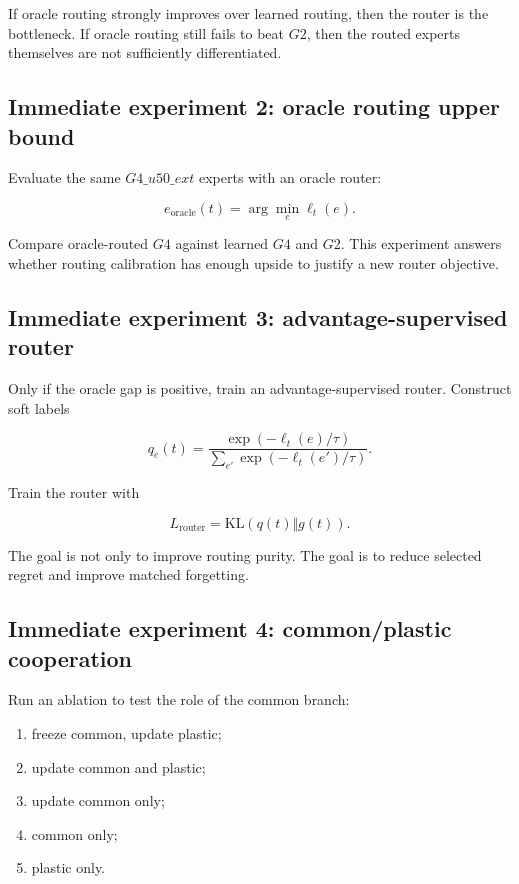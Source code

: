 \documentclass[11pt]{article}
\begin{document}
If oracle routing strongly improves over learned routing, then the router is the bottleneck. If oracle routing still fails to beat $G2$, then the routed experts themselves are not sufficiently differentiated.

\subsection{Immediate experiment 2: oracle routing upper bound}

Evaluate the same $G4\_u50\_ext$ experts with an oracle router:

$$
e_{\mathrm{oracle}}(t)=\arg\min_e \ell_t(e).
$$

Compare oracle-routed $G4$ against learned $G4$ and $G2$. This experiment answers whether routing calibration has enough upside to justify a new router objective.

\subsection{Immediate experiment 3: advantage-supervised router}

Only if the oracle gap is positive, train an advantage-supervised router. Construct soft labels

$$
q_e(t)=
\frac{\exp(-\ell_t(e)/\tau)}
{\sum_{e'}\exp(-\ell_t(e')/\tau)}.
$$

Train the router with

$$
L_{\mathrm{router}}
=
\mathrm{KL}(q(t)\Vert g(t)).
$$

The goal is not only to improve routing purity. The goal is to reduce selected regret and improve matched forgetting.

\subsection{Immediate experiment 4: common/plastic cooperation}

Run an ablation to test the role of the common branch:

\begin{enumerate}[leftmargin=1.5em]
    \item freeze common, update plastic;
    \item update common and plastic;
    \item update common only;
    \item common only;
    \item plastic only.
\end{enumerate}
\end{document}
